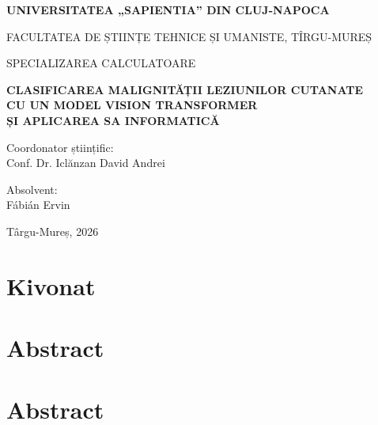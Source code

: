 \documentclass[12pt, twosides]{report}
\begin{document}
\begin{titlepage}
\centering
\linespread{1.25}\selectfont
{\large\bfseries UNIVERSITATEA „SAPIENTIA” DIN CLUJ-NAPOCA\par}
\vspace{0.4em}
{\large FACULTATEA DE ȘTIINȚE TEHNICE ȘI UMANISTE, TÎRGU-MUREȘ\par}
\vspace{0.4em}
{\large SPECIALIZAREA CALCULATOARE\par}

\vfill

{\Large\bfseries CLASIFICAREA MALIGNITĂȚII LEZIUNILOR CUTANATE\\[0.35em]
CU UN MODEL VISION TRANSFORMER\\[0.35em]
ȘI APLICAREA SA INFORMATICĂ\par}

\vfill

\noindent\begin{minipage}[t]{0.5\textwidth}
\raggedright
Coordonator științific:\\
Conf. Dr. Iclănzan David Andrei
\end{minipage}%
\begin{minipage}[t]{0.5\textwidth}
\raggedleft
Absolvent:\\
Fábián Ervin
\end{minipage}

\vspace{1.6cm}

{Târgu-Mureș, 2026\par}
\end{titlepage}




\section*{Kivonat}

\clearpage

\section*{Abstract}

\clearpage

\section*{Abstract}

\clearpage
\end{document}

